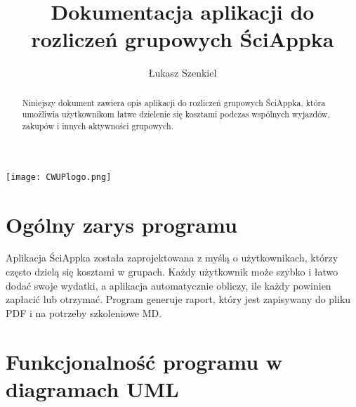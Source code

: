 \documentclass{article}
\title{Dokumentacja aplikacji do rozliczeń grupowych ŚciAppka}
\author{Łukasz Szenkiel}
\date{}
\begin{document}
	
\maketitle
\thispagestyle{empty}
\begin{center}
	\texttt{[image: CWUPlogo.png]}
\end{center}
	
\newpage
\begin{abstract}
Niniejszy dokument zawiera opis aplikacji do rozliczeń grupowych ŚciAppka, która umożliwia użytkownikom łatwe dzielenie się kosztami podczas wspólnych wyjazdów, zakupów i innych aktywności grupowych.
\end{abstract}
	
\section{Ogólny zarys programu}
Aplikacja ŚciAppka została zaprojektowana z myślą o użytkownikach, którzy często dzielą się kosztami w grupach. Każdy użytkownik może szybko i łatwo dodać swoje wydatki, a aplikacja automatycznie obliczy, ile każdy powinien zapłacić lub otrzymać. Program generuje raport, który jest zapisywany do pliku PDF i na potrzeby szkoleniowe MD.
	
\section{Funkcjonalność programu w diagramach UML}
\end{document}
